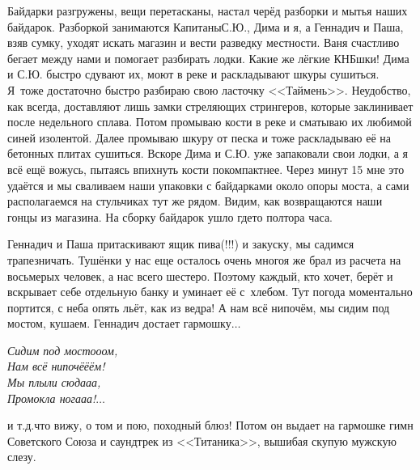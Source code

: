 Байдарки разгружены, вещи перетасканы, настал черёд разборки и мытья наших байдарок. Разборкой занимаются Капитаны\mdash С.Ю., Дима и я, а Геннадич и Паша, взяв сумку, уходят искать магазин и вести разведку местности. Ваня счастливо бегает между нами и помогает разбирать лодки. Какие же лёгкие КНБ\sdash шки! Дима и С.Ю. быстро сдувают их, моют в реке и раскладывают шкуры сушиться. Я~тоже достаточно быстро разбираю свою ласточку <<Таймень>>. Неудобство, как всегда, доставляют лишь замки стреляющих стрингеров, которые заклинивает после недельного сплава. Потом промываю кости в реке и сматываю их любимой синей изолентой. Далее промываю шкуру от песка и тоже раскладываю её на бетонных плитах сушиться. Вскоре Дима и С.Ю. уже запаковали свои лодки, а я всё ещё вожусь, пытаясь впихнуть кости покомпактнее. Через минут 15 мне это удаётся и мы сваливаем наши упаковки с байдарками около опоры моста, а сами располагаемся на стульчиках тут же рядом. Видим, как возвращаются наши гонцы из магазина. На сборку байдарок ушло где\sdash то полтора часа.

Геннадич и Паша притаскивают ящик пива(!!!) и закуску, мы садимся трапезничать. Тушёнки у нас еще осталось очень много\mdash я же брал из расчета на восьмерых человек, а нас всего шестеро. Поэтому каждый, кто хочет, берёт и вскрывает себе отдельную банку и уминает её с~хлебом. Тут погода моментально портится, с неба опять льёт, как из ведра! А нам всё нипочём, мы сидим под мостом, кушаем. Геннадич достает гармошку$\ldots$ %

\vspace{0.5cm}
\noindent\textit{%
Сидим под мосто\sdash о\sdash ом,\\
Нам всё нипочё\sdash ё\sdash ём!\\
Мы плыли сюда\sdash а\sdash а,\\ 
Промокла нога\sdash а\sdash а!$\ldots$ 
}

\newpage
\noindent и т.д.\mdash что вижу, о том и пою, походный блюз! Потом он выдает на гармошке гимн Советского Союза и саундтрек из <<Титаника>>, вышибая скупую мужскую слезу. 

